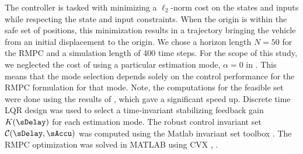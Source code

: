 The controller is tasked with minimizing a $\ell_2$-norm cost on the states and inputs while respecting the state and input constraints.
When the origin is within the safe set of positions, this minimization results in a trajectory bringing the vehicle from an initial displacement to the origin.
We chose %
a horizon length $N = 50$ for the RMPC and a simulation length of 400 time steps.
For the scope of this study, we neglected the cost of using a particular estimation mode, \ie $\alpha=0$ in .
This means that the mode selection depends solely on the control performance for the RMPC formulation for that mode. Note, the computations for the feasible set were done using the results of , which gave a significant speed up. Discrete time LQR design was used to select %
a time-invariant stabilizing feedback gain $K(\sDelay)$ for each estimation mode.%
The robust control invariant set $\CCC(\sDelay, \sAccu)$ was computed using the Matlab invariant set toolbox \cite{invset}.
The RMPC optimization was solved in MATLAB using CVX \cite{cvx}, \cite{cvx2}.

